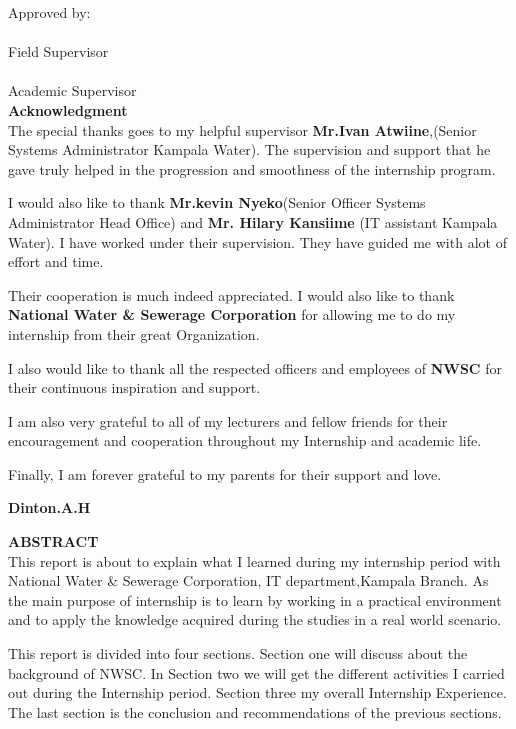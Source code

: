 \documentclass{article}
\begin{document}
Approved by:\\
\makebox[2.5in]{\hrulefill} \hspace{0.3in}\makebox[2.5in]{\dotfill}\\
Field Supervisor \\
\vspace{.1in}
\makebox[2.5in]{\hrulefill} \hspace{0.3in}\makebox[2.5in]{\dotfill}\\
Academic Supervisor \\
\newpage
\textbf{Acknowledgment}\\
The special thanks goes to my helpful supervisor \textbf{Mr.Ivan Atwiine},(Senior Systems Administrator Kampala Water). The supervision and support that he gave truly helped in the progression and smoothness of the internship program.
\par I would also like to thank \textbf{Mr.kevin Nyeko}(Senior Officer Systems Administrator Head Office) and \textbf{Mr. Hilary Kansiime} (IT assistant Kampala Water). I have worked under their supervision. They have guided me with alot of effort and time.
\par Their cooperation is much indeed appreciated. I would also like to thank \textbf{National Water \& Sewerage Corporation} for allowing me to do my internship from their great Organization.
\par I also would like to thank all the respected officers and employees of \textbf{NWSC} for their continuous inspiration and support.
\par I am also very grateful to all of my lecturers and fellow friends for their encouragement and cooperation throughout my Internship and academic life.
\par Finally, I am forever grateful to my parents for their support and love.
\begin{flushright}
\textbf{Dinton.A.H}
\end{flushright}
\thispagestyle{empty}
\newpage
\textbf{ABSTRACT}\\
This report is about to explain what I learned during my internship period with National Water \& Sewerage Corporation, IT department,Kampala Branch. As the main purpose of internship is to learn by working in a practical environment and to apply the knowledge acquired during the studies in a real world scenario.
\par This report is divided into four  sections. Section one will discuss about the background of NWSC. In Section two we will get the different activities I carried out during the Internship period. Section three my overall Internship Experience. The last section is the conclusion and recommendations of the previous sections.
\end{document}
